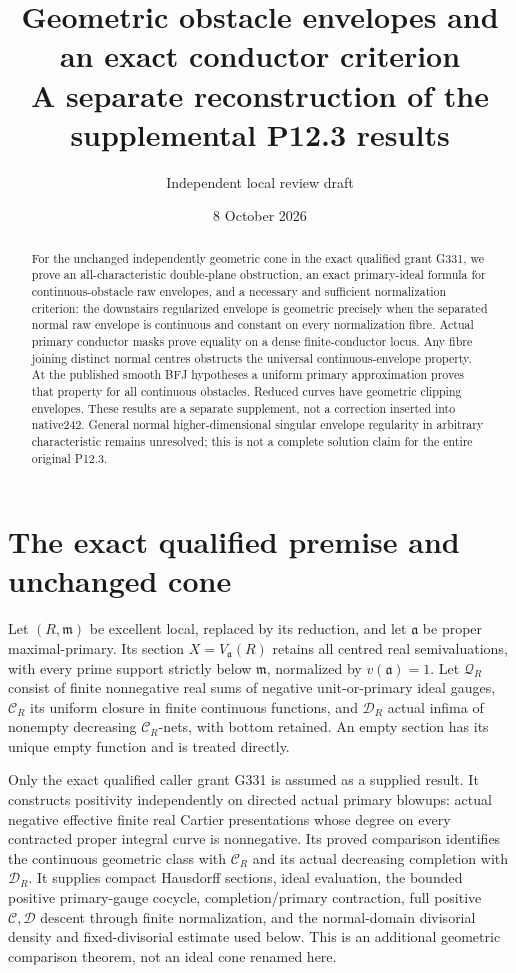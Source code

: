 \documentclass[11pt]{article}
\title{Geometric obstacle envelopes and an exact conductor criterion\\
A separate reconstruction of the supplemental P12.3 results}
\author{Independent local review draft}
\date{8 October 2026}
\newcommand{\C}{\mathcal C}
\newcommand{\D}{\mathcal D}
\newcommand{\Q}{\mathcal Q}
\newcommand{\m}{\mathfrak m}
\newcommand{\aideal}{\mathfrak a}
\begin{document}
\maketitle
\begin{abstract}
For the unchanged independently geometric cone in the exact qualified grant
G331, we prove an all-characteristic double-plane obstruction, an exact
primary-ideal formula for continuous-obstacle raw envelopes, and a necessary
and sufficient normalization criterion: the downstairs regularized envelope
is geometric precisely when the separated normal raw envelope is continuous
and constant on every normalization fibre. Actual primary conductor masks
prove equality on a dense finite-conductor locus. Any fibre joining distinct
normal centres obstructs the universal continuous-envelope property. At the
published smooth BFJ hypotheses a uniform primary approximation proves that
property for all continuous obstacles. Reduced curves have geometric clipping
envelopes. These results are a separate supplement, not a correction inserted
into native242. General normal higher-dimensional singular envelope regularity
in arbitrary characteristic remains unresolved; this is not a complete solution
claim for the entire original P12.3.
\end{abstract}
\tableofcontents

\section{The exact qualified premise and unchanged cone}
Let $(R,\m)$ be excellent local, replaced by its reduction, and let
$\aideal$ be proper maximal-primary. Its section $X=V_{\aideal}(R)$
retains all centred real semivaluations, with every prime support strictly
below $\m$, normalized by $v(\aideal)=1$. Let $\Q_R$ consist of finite
nonnegative real sums of negative unit-or-primary ideal gauges, $\C_R$ its
uniform closure in finite continuous functions, and $\D_R$ actual infima of
nonempty decreasing $\C_R$-nets, with bottom retained. An empty section has
its unique empty function and is treated directly.

Only the exact qualified caller grant G331 is assumed as a supplied result.
It constructs positivity independently on directed actual primary blowups:
actual negative effective finite real Cartier presentations whose degree on
every contracted proper integral curve is nonnegative. Its proved comparison
identifies the continuous geometric class with $\C_R$ and its actual decreasing
completion with $\D_R$. It supplies compact Hausdorff sections, ideal evaluation,
the bounded positive primary-gauge cocycle, completion/primary contraction,
full positive $\C,\D$ descent through finite normalization, and the normal-domain
divisorial density and fixed-divisorial estimate used below. This is an
additional geometric comparison theorem, not an ideal cone renamed here.
\end{document}
